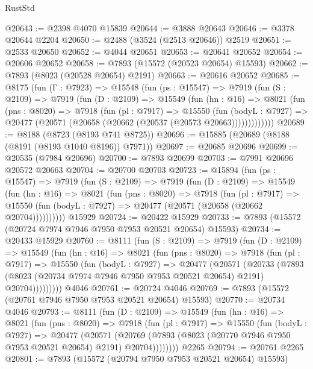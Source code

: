 \begin{lexlean}{RustStd}
\begin{coremodule}
@20643 := @2398 @4070 @15839
@20644 := @3888 @20643
@20646 := @3378 @20644 @2204
@20650 := @2488 (@3524 (@2513 @20646)) @2519
@20651 := @2533 @20650
@20652 := @4044 @20651
@20653 := @20641 @20652
@20654 := @20606 @20652
@20658 := @7893 (@15572 (@20523 @20654) @15593)
@20662 := @7893 (@8023 (@20528 @20654) @2191)
@20663 := @20616 @20652
@20685 := @8175
    (fun (Γ : @7923) =>
    @15548
      (fun (ps : @15547) =>
      @7919
        (fun (S : @2109) =>
        @7919
          (fun (D : @2109) =>
          @15549
            (fun (hn : @16) =>
            @8021
              (fun (pns : @8020) =>
              @7918
                (fun (pl : @7917) =>
                @15550
                  (fun (bodyL : @7927) =>
                  @20477 (@20571 (@20658 (@20662 (@20537 (@20573 @20663)))))))))))))
@20689 := @8188 (@8723 (@8193 @741 @8725))
@20696 := @15885 (@20689 (@8188 (@8191 (@8193 @1040 @8196)) @7971))
@20697 := @20685 @20696
@20699 := @20535 (@7984 @20696)
@20700 := @7893 @20699
@20703 := @7991 @20696 @20572 @20663
@20704 := @20700 @20703
@20723 := @15894
    (fun (ps : @15547) =>
    @7919
      (fun (S : @2109) =>
      @7919
        (fun (D : @2109) =>
        @15549
          (fun (hn : @16) =>
          @8021
            (fun (pns : @8020) =>
            @7918
              (fun (pl : @7917) =>
              @15550 (fun (bodyL : @7927) => @20477 (@20571 (@20658 (@20662 @20704))))))))))
    @15929
@20724 := @20422 @15929
@20733 := @7893 (@15572 (@20724 @7974 @7946 @7950 @7953 @20521 @20654) @15593)
@20734 := @20433 @15929
@20760 := @8111
    (fun (S : @2109) =>
    @7919
      (fun (D : @2109) =>
      @15549
        (fun (hn : @16) =>
        @8021
          (fun (pns : @8020) =>
          @7918
            (fun (pl : @7917) =>
            @15550
              (fun (bodyL : @7927) =>
              @20477
                (@20571
                  (@20733
                    (@7893
                      (@8023 (@20734 @7974 @7946 @7950 @7953 @20521 @20654) @2191)
                      @20704)))))))))
    @4046
@20761 := @20724 @4046
@20769 := @7893 (@15572 (@20761 @7946 @7950 @7953 @20521 @20654) @15593)
@20770 := @20734 @4046
@20793 := @8111
    (fun (D : @2109) =>
    @15549
      (fun (hn : @16) =>
      @8021
        (fun (pns : @8020) =>
        @7918
          (fun (pl : @7917) =>
          @15550
            (fun (bodyL : @7927) =>
            @20477
              (@20571
                (@20769 (@7893 (@8023 (@20770 @7946 @7950 @7953 @20521 @20654) @2191) @20704))))))))
    @2265
@20794 := @20761 @2265
@20801 := @7893 (@15572 (@20794 @7950 @7953 @20521 @20654) @15593)

\end{coremodule}
\end{lexlean}
